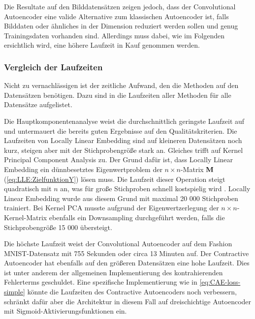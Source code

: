 Die Resultate auf den Bilddatensätzen zeigen jedoch, dass der Convolutional Autoencoder eine valide
Alternative zum klassischen Autoencoder ist, falls Bilddaten oder ähnliches in der Dimension
reduziert werden sollen und genug Trainingsdaten vorhanden sind. Allerdings muss dabei, wie im
Folgenden ersichtlich wird, eine höhere Laufzeit in Kauf genommen werden.

\subsubsection{Vergleich der Laufzeiten}

Nicht zu vernachlässigen ist der zeitliche Aufwand, den die Methoden auf den Datensätzen benötigen.
Dazu sind in  die Laufzeiten aller Methoden für alle Datensätze
aufgelistet.


Die Hauptkomponentenanalyse weist die durchschnittlich geringste Laufzeit auf und untermauert die bereits guten Ergebnisse auf den Qualitätskriterien. Die Laufzeiten von Locally Linear Embedding sind auf kleineren Datensätzen noch kurz, steigen aber mit der Stichprobengröße stark an. Gleiches trifft auf Kernel Principal Component Analysis zu. Der Grund dafür ist, dass Locally Linear Embedding ein dünnbesetztes Eigenwertproblem der $n \times n$-Matrix $\mathbf{M}$ (\eqref{eq:LLE:ZielfunktionY}) lösen muss. Die Laufzeit dieser Operation steigt quadratisch mit $n$ an, was für große Stichproben schnell kostspielig wird \parencite[9]{Saul.2000}. Locally Linear Embedding wurde aus diesem Grund mit maximal 20 000
Stichproben trainiert. Bei Kernel PCA musste aufgrund der Eigenwertzerlegung der $n \times
	n$-Kernel-Matrix ebenfalls ein Downsampling durchgeführt werden, falls die Stichprobengröße 15 000
übersteigt.

Die höchste Laufzeit weist der Convolutional Autoencoder auf dem Fashion MNIST-Datensatz mit 755
Sekunden oder circa 13 Minuten auf. Der Contractive Autoencoder hat ebenfalls auf den größeren
Datensätzen eine hohe Laufzeit. Dies ist unter anderem der allgemeinen Implementierung des
kontrahierenden Fehlerterms geschuldet. Eine spezifische Implementierung wie in
\eqref{eq:CAE-loss-simple} könnte die Laufzeiten des Contractive Autoencoders noch verbessern,
schränkt dafür aber die Architektur in diesem Fall auf dreischichtige Autoencoder mit
Sigmoid-Aktivierungsfunktionen ein.

